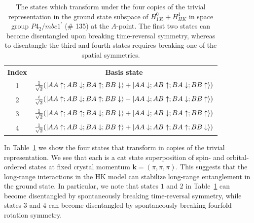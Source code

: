 \documentclass[prb,aps,amssymb,twocolumn,notitlepage]{revtex4-2}
\begin{document}
\begin{table}[ht]
\centering %
\renewcommand*{\arraystretch}{1}
\begin{tabular}{c c c} %
\hline\hline %
Index & \multicolumn{2}{c}{Basis state} \\[0.5ex]
\hline %
\rule{0pt}{1\normalbaselineskip}
1&\multicolumn{2}{c}{$\tfrac{1}{\sqrt{2}}(\ket{AA\uparrow;AB\downarrow;BA\uparrow;BB\downarrow}+\ket{AA\downarrow;AB\uparrow;BA\downarrow;BB\uparrow})$}\\[2ex]
2&\multicolumn{2}{c}{$\tfrac{i}{\sqrt{2}}(\ket{AA\uparrow;AB\downarrow;BA\uparrow;BB\downarrow}-\ket{AA\downarrow;AB\uparrow;BA\downarrow;BB\uparrow})$}\\[2ex]
3&\multicolumn{2}{c}{$\tfrac{1}{\sqrt{2}}(\ket{AA\uparrow;AB\uparrow;BA\downarrow;BB\downarrow}+\ket{AA\downarrow;AB\downarrow;BA\uparrow;BB\uparrow})$}\\[2ex]
4&\multicolumn{2}{c}{$\tfrac{1}{\sqrt{2}}(\ket{AA\uparrow;AB\downarrow;BA\downarrow;BB\uparrow}+\ket{AA\downarrow;AB\uparrow;BA\uparrow;BB\downarrow})$}\\[1ex]
\hline %
\end{tabular}
\caption{The states which transform under the four copies of the trivial representation in the ground state subspace of $H^0_{135}+H^1_{HK}$ in space group $P4_2/mbc1^\prime$ (\# 135) at the $A$-point. 
The first two states can become disentangled upon breaking time-reversal symmetry, whereas to disentangle the third and fourth states requires breaking one of the spatial symmetries.}
\label{table:Trivialrepstates} %
\end{table}

In Table~\ref{table:Trivialrepstates} we show the four states that transform in copies of the trivial representation. 
We see that each is a cat state superposition of spin- and orbital-ordered states at fixed crystal momentum $\mathbf{k}=(\pi,\pi,\pi)$. 
This suggests that the long-range interactions in the HK model can stabilize long-range entanglement in the ground state. 
In particular, we note that states $1$ and $2$ in Table~\ref{table:Trivialrepstates} can become disentangled by spontaneously breaking time-reversal symmetry, while states $3$ and $4$ can become disentangled by spontaneously breaking fourfold rotation symmetry. 
\end{document}
